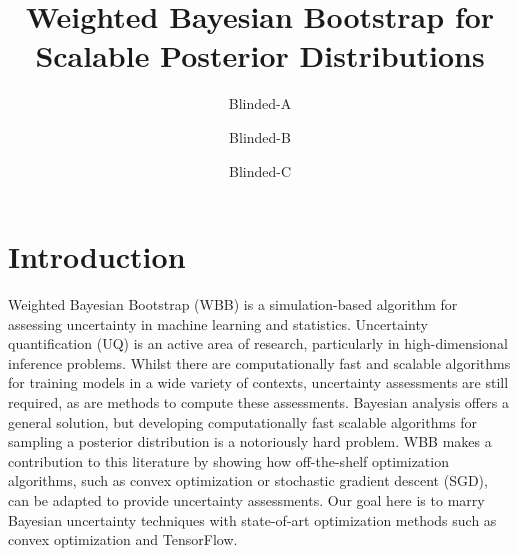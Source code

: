 \documentclass[12pt]{TD-CJS}
\begin{document}


\title[Weighted Bayesian Bootstrap]{Weighted Bayesian Bootstrap for Scalable Posterior Distributions }
\author{Blinded-A}
\author{Blinded-B}
\author{Blinded-C}


\makechaptertitle


\newpage

\section{Introduction}
Weighted Bayesian Bootstrap (WBB) is a simulation-based algorithm for assessing uncertainty in machine learning and statistics. Uncertainty quantification (UQ) is an active area of research, particularly in high-dimensional inference problems. Whilst there are computationally fast and scalable algorithms for training models in a wide variety of contexts, uncertainty assessments are still required, as are methods to compute these assessments.  Bayesian analysis offers a general solution, but developing computationally fast scalable algorithms for sampling a posterior distribution is a notoriously hard problem. WBB makes a contribution to this literature by showing how off-the-shelf optimization algorithms, such as convex optimization or stochastic gradient descent (SGD), can be adapted to provide uncertainty assessments. Our goal here is to marry Bayesian uncertainty techniques with state-of-art optimization methods such as convex optimization and TensorFlow.
 
\end{document}
